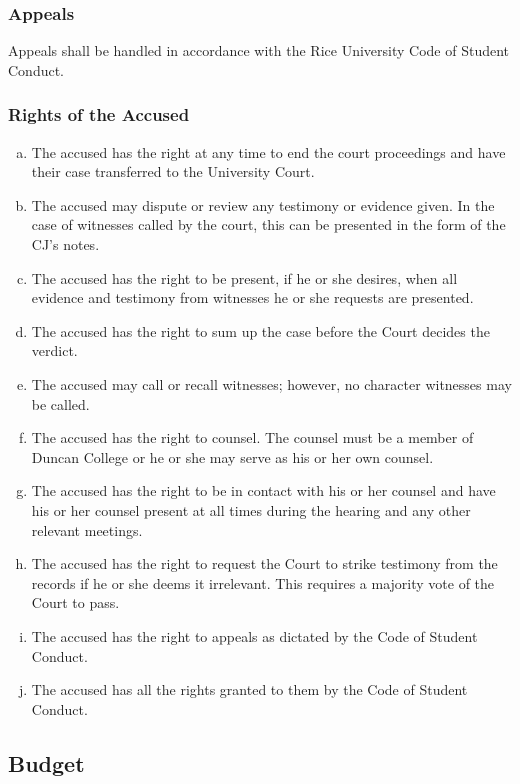\documentclass[USletter,12pt]{article}
\begin{document}
\subsubsection{Appeals}
Appeals shall be handled in accordance with the Rice University Code of Student Conduct.

\subsubsection{Rights of the Accused}
\begin{enumerate}[(a)]
\item The accused has the right at any time to end the court proceedings and have their case transferred to the University Court.
\item The accused may dispute or review any testimony or evidence given.  In the case of witnesses called by the court, this can be presented in the form of the CJ's notes.
\item The accused has the right to be present, if he or she desires, when all evidence and testimony from witnesses he or she requests are presented.
\item The accused has the right to sum up the case before the Court decides the verdict.
\item The accused may call or recall witnesses; however, no character witnesses may be called.
\item The accused has the right to counsel.  The counsel must be a member of Duncan College or he or she may serve as his or her own counsel.
\item The accused has the right to be in contact with his or her counsel and have his or her counsel present at all times during the hearing and any other relevant meetings.
\item The accused has the right to request the Court to strike testimony from the records if he or she deems it irrelevant.  This requires a majority vote of the Court to pass.
\item The accused has the right to appeals as dictated by the Code of Student Conduct.
\item The accused has all the rights granted to them by the Code of Student Conduct.
\end{enumerate}


\subsection{Budget}
\end{document}
